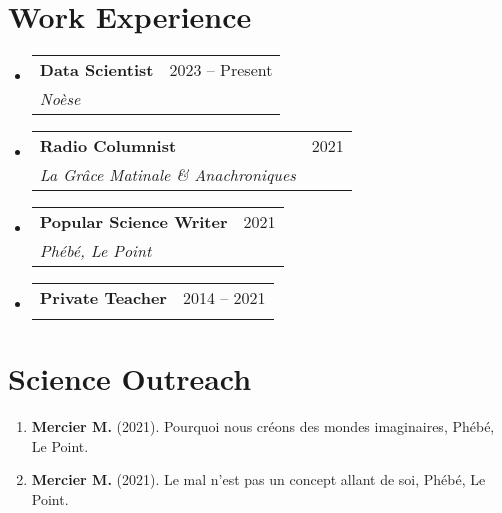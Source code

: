 \documentclass[letterpaper,11pt]{article}
\makeatletter
\newcommand{\resumeItem}[1]{
  \item\small{
    {#1 \vspace{-2pt}}
  }
}
\newcommand{\resumeSubheading}[4]{
  \vspace{1pt}\item
    \begin{tabular*}{0.97\textwidth}[t]{l@{\extracolsep{\fill}}r}
      \textbf{#1} & #2 \\
      \textit{\small#3} & \textit{\small #4} \\
    \end{tabular*}\vspace{-7pt}
}
\newcommand{\resumeSubSubheading}[2]{
    \item
    \begin{tabular*}{0.97\textwidth}{l@{\extracolsep{\fill}}r}
      \textit{\small#1} & \textit{\small #2} \\
    \end{tabular*}\vspace{-7pt}
}
\newcommand{\resumeSubHeadingListStart}{\begin{itemize}[leftmargin=0.15in, label={}]}
\newcommand{\resumeSubHeadingListEnd}{\end{itemize}}
\newcommand{\resumeItemListStart}{\begin{itemize}}
\newcommand{\resumeItemListEnd}{\end{itemize}\vspace{-5pt}}
\makeatother
\begin{document}
\section{Work Experience}
  \resumeSubHeadingListStart

    \resumeSubheading
      {Data Scientist}{2023 -- Present}
      {Noèse}{}
      
    \resumeSubheading
      {Radio Columnist}{2021}
      {La Grâce Matinale \& Anachroniques}{}

    \resumeSubheading
      {Popular Science Writer}{2021}
      {Phébé, Le Point}{}

    \resumeSubheading
      {Private Teacher}{2014 -- 2021}
      {}{}
      
  \resumeSubHeadingListEnd


\section{Science Outreach}
  \begin{enumerate}
    \resumeItem{\textbf{Mercier M.} (2021). Pourquoi nous créons des mondes imaginaires, Phébé, Le Point.}
    \resumeItem{\textbf{Mercier M.} (2021). Le mal n’est pas un concept allant de soi, Phébé, Le Point.}
  \end{enumerate}





\end{document}
